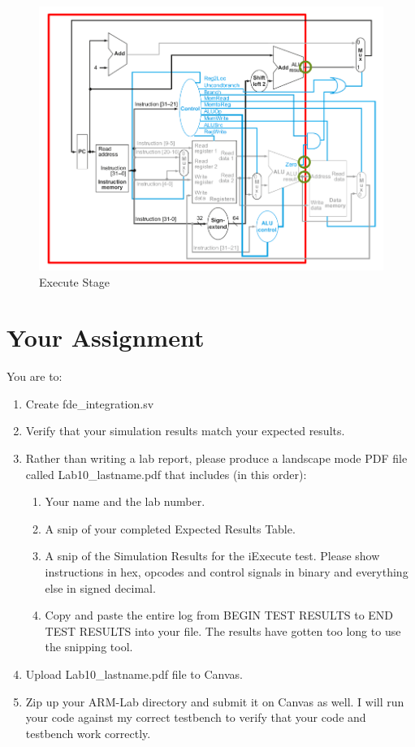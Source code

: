 \begin{figure}
	\caption{Execute Stage}\label{fig:integrated_execute}
	\begin{center}
		\includegraphics[width=4.75in]{../images/integrated_execute.png}
	\end{center}
\end{figure} 

\section{Your Assignment}

You are to:
\begin{enumerate}
\item Create fde\_integration.sv
\item Verify that your simulation results match your expected results.
\item Rather than writing a lab report, please produce a landscape mode PDF file called Lab10\_lastname.pdf that includes (in this order):
\begin{enumerate}
	\item Your name and the lab number.
	\item A snip of your completed Expected Results Table.
	\item A snip of the Simulation Results for the iExecute test.  Please show instructions in hex, opcodes and control signals in binary and everything else in signed decimal.  
	\item Copy and paste the entire log from BEGIN TEST RESULTS to END TEST RESULTS into your file.  The results have gotten too long to use the snipping tool.	
\end{enumerate}
\item Upload Lab10\_lastname.pdf file to Canvas.
\item Zip up your ARM-Lab directory and submit it on Canvas as well.  I will run your code against my correct testbench to verify that your code and testbench work correctly.
\end{enumerate}